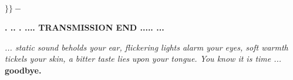 {
    \hspace{\textwidth}    
    \Huge $\}\}-$
}

\begin{flushright}
    \Large \textbf{. .. . .... TRANSMISSION END ..... ...}
\end{flushright}
\vspace{1cm}
\textit{... static sound beholds your ear, flickering lights alarm your eyes, soft warmth tickels your skin, a bitter taste lies upon your tongue. You know it is time ...}\\

\hspace{7cm}\textbf{goodbye.}